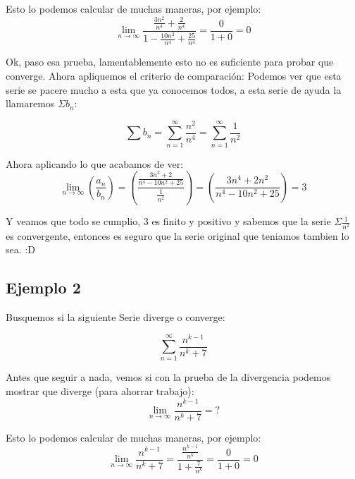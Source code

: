 \documentclass[12pt]{report}							    %
\begin{document}
    Esto lo podemos calcular de muchas maneras, por ejemplo:
    \begin{equation*}
        \lim_{n \to \infty} \frac{ \frac{3n^2}{n^4} +\frac{2}{n^4}  }{ 1 - \frac{10n^2}{n^4} + \frac{25}{n^4} } = \frac{0}{1+0} = 0
    \end{equation*}

    Ok, paso esa prueba, lamentablemente esto no es
    suficiente para probar que converge.
    Ahora apliquemos el criterio de comparación: Podemos ver que esta serie se pacere mucho a esta que ya conocemos todos, a esta serie de ayuda la llamaremos $\Sigma b_n$:

    \begin{equation*}
        \sum b_n = \sum_{n=1}^{\infty} \frac{n^2}{n^4} = \sum_{n=1}^{\infty} \frac{1}{n^2}
    \end{equation*}

    Ahora aplicando lo que acabamos de ver:
    \begin{equation*}
        \lim_{n \to \infty} \left( \frac{a_n}{b_n} \right) = \left( \frac{ \frac{3n^2+2}{n^4-10n^2+25} }{ \frac{1}{n^2} } \right) =  \left( \frac{3n^4+2n^2}{n^4-10n^2+25} \right) = 3
    \end{equation*}

    Y veamos que todo se cumplio, 3 es finito y positivo y sabemos que la serie $\Sigma \frac{1}{n^2}$ es convergente, entonces es seguro que la serie original que teniamos tambien lo sea. :D


    \subsection{Ejemplo 2}
    Busquemos si la siguiente Serie diverge o converge:

    \begin{equation*}
        \sum_{n=1}^{\infty} \frac{n^{k-1}}{n^k+7}
    \end{equation*}
     
    Antes que seguir a nada, vemos si con la prueba de la divergencia podemos mostrar que diverge (para ahorrar trabajo):
    \begin{equation*}
        \lim_{n \to \infty} \frac{n^{k-1}}{n^k+7} = ?
    \end{equation*}

    Esto lo podemos calcular de muchas maneras, por ejemplo:
    \begin{equation*}
        \lim_{n \to \infty} \frac{n^{k-1}}{n^k+7} = \frac{ \frac{n^{k-1}}{n^k} }{1+\frac{7}{n^k}} = \frac{0}{1+0} = 0
    \end{equation*}
\end{document}

